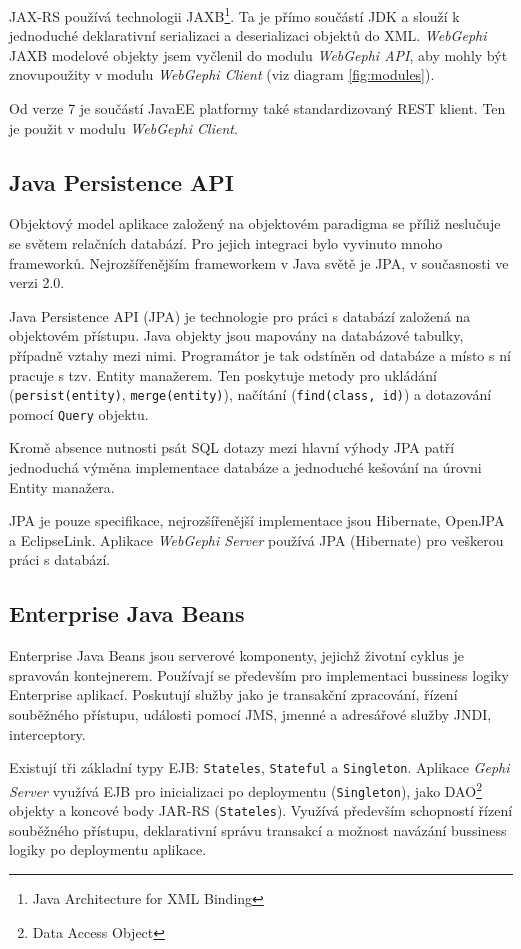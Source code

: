 \documentclass[thesis=M,czech]{FITthesis}[2014/05/6]
\begin{document}
JAX-RS používá technologii JAXB\footnote{Java Architecture for XML Binding\cite{jaxb}}. Ta je přímo součástí JDK a slouží k jednoduché deklarativní serializaci a deserializaci objektů do XML.
\textit{WebGephi} JAXB modelové objekty jsem vyčlenil do modulu \textit{WebGephi API}, aby mohly být znovupoužity v modulu \textit{WebGephi Client} (viz diagram \ref{fig:modules}).

Od verze 7 je součástí JavaEE platformy také standardizovaný REST klient. Ten je použit v modulu \textit{WebGephi Client}.

\subsection{Java Persistence API}
Objektový model aplikace založený na objektovém paradigma se příliž neslučuje se světem relačních databází. Pro jejich integraci
bylo vyvinuto mnoho frameworků. Nejrozšířenějším frameworkem v Java světě je JPA, v současnosti ve verzi 2.0.

Java Persistence API (JPA) je technologie pro práci s databází založená na objektovém přístupu. Java objekty jsou mapovány na databázové tabulky, případně 
vztahy mezi nimi. Programátor je tak odstíněn od databáze a místo s ní pracuje s tzv. Entity manažerem. Ten poskytuje metody pro ukládání (\texttt{persist(entity)}, \texttt{merge(entity)}), 
načítání (\texttt{find(class, id)}) a dotazování pomocí \texttt{Query} objektu.

Kromě absence nutnosti psát SQL dotazy mezi hlavní výhody JPA patří jednoduchá výměna implementace databáze a jednoduché kešování na úrovni Entity manažera.

JPA je pouze specifikace, nejrozšířenější implementace jsou Hibernate, OpenJPA a EclipseLink. Aplikace \textit{WebGephi Server} používá JPA (Hibernate) pro veškerou práci s databází.

\subsection{Enterprise Java Beans\cite{ejb}}
Enterprise Java Beans jsou serverové komponenty, jejichž životní cyklus je spravován kontejnerem. Používají se především pro implementaci bussiness logiky 
Enterprise aplikací. Poskutují služby jako je transakční zpracování, řízení souběžného přístupu, události pomocí JMS, jmenné a adresářové služby JNDI, interceptory.

Existují tři základní typy EJB: \texttt{Stateles}, \texttt{Stateful} a \texttt{Singleton}. Aplikace \textit{Gephi Server}  využívá EJB pro inicializaci 
po deploymentu (\texttt{Singleton}), jako DAO\footnote{Data Access Object} objekty a koncové body JAR-RS (\texttt{Stateles}). Využívá především schopností 
řízení souběžného přístupu, deklarativní správu transakcí a možnost navázání bussiness logiky po deploymentu aplikace. 
\end{document}

